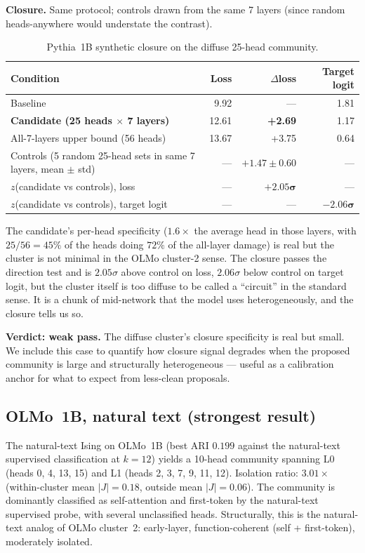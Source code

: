\documentclass[11pt]{article}
\begin{document}
\textbf{Closure.} Same protocol; controls drawn from the same 7 layers
(since random heads-anywhere would understate the contrast).

\begin{table}[h]
\centering
\small
\begin{tabularx}{\textwidth}{lrrr}
\toprule
Condition & Loss & $\Delta$loss & Target logit \\
\midrule
Baseline & 9.92 & --- & 1.81 \\
\textbf{Candidate (25 heads $\times$ 7 layers)} & 12.61 & \textbf{+2.69} & 1.17 \\
All-7-layers upper bound (56 heads) & 13.67 & +3.75 & 0.64 \\
Controls (5 random 25-head sets in same 7 layers, mean $\pm$ std) & --- & $+1.47 \pm 0.60$ & --- \\
$z$(candidate vs controls), loss & --- & $\mathbf{+2.05\sigma}$ & --- \\
$z$(candidate vs controls), target logit & --- & --- & $\mathbf{-2.06\sigma}$ \\
\bottomrule
\end{tabularx}
\caption{Pythia~1B synthetic closure on the diffuse 25-head community.}
\label{tab:pythia-synth}
\end{table}

The candidate's per-head specificity ($1.6\times$ the average head in
those layers, with $25/56 = 45\%$ of the heads doing $72\%$ of the
all-layer damage) is real but the cluster is not minimal in the OLMo
cluster-2 sense. The closure passes the direction test and is $2.05\sigma$
above control on loss, $2.06\sigma$ below control on target logit, but the
cluster itself is too diffuse to be called a ``circuit'' in the standard
sense. It is a chunk of mid-network that the model uses heterogeneously,
and the closure tells us so.

\textbf{Verdict: weak pass.} The diffuse cluster's closure specificity is
real but small. We include this case to quantify how closure signal
degrades when the proposed community is large and structurally
heterogeneous --- useful as a calibration anchor for what to expect from
less-clean proposals.

\subsection{OLMo~1B, natural text (strongest result)}
\label{sec:olmo-natural}

The natural-text Ising on OLMo~1B (best ARI $0.199$ against the
natural-text supervised classification at $k=12$) yields a 10-head
community spanning L0 (heads 0, 4, 13, 15) and L1 (heads 2, 3, 7, 9, 11,
12). Isolation ratio: $3.01\times$ (within-cluster mean $|J| = 0.18$,
outside mean $|J| = 0.06$). The community is dominantly classified as
self-attention and first-token by the natural-text supervised probe, with
several unclassified heads. Structurally, this is the natural-text analog
of OLMo cluster~2: early-layer, function-coherent (self + first-token),
moderately isolated.
\end{document}

